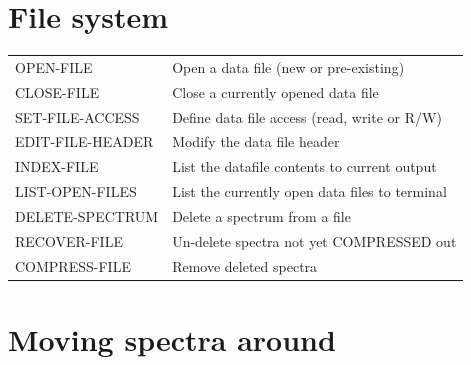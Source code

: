 \documentclass[11pt,twoside]{report}
\begin{document}
\section{File system} 

\begin{tabular}{ll}
OPEN-FILE              & Open a data file (new or pre-existing)\\
CLOSE-FILE             & Close a currently opened data file\\
SET-FILE-ACCESS        & Define data file access (read, write or R/W)\\
EDIT-FILE-HEADER       & Modify the data file header\\
INDEX-FILE             & List the datafile contents to current output\\
LIST-OPEN-FILES        & List the currently open data files to terminal\\
DELETE-SPECTRUM        & Delete a spectrum from a file\\
RECOVER-FILE           & Un-delete spectra not yet COMPRESSED out\\
COMPRESS-FILE          & Remove deleted spectra\\
\end{tabular}

\section{Moving spectra around} 
\end{document}
